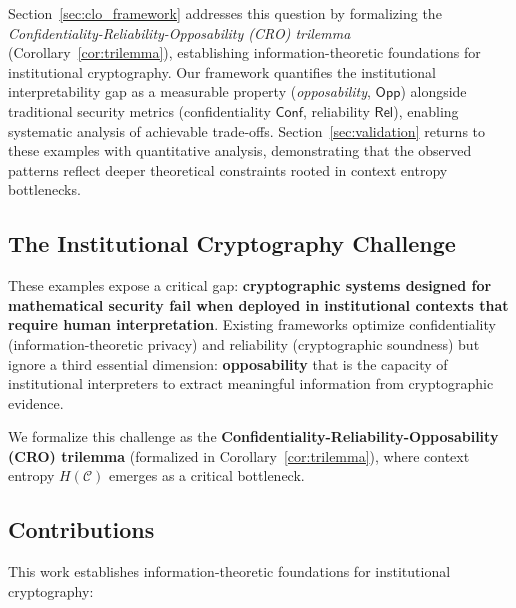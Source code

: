 \documentclass{ieeeaccess}
\begin{document}
Section~\ref{sec:clo_framework} addresses this question by formalizing the \emph{Confidentiality-Reliability-Opposability (CRO) trilemma} (Corollary~\ref{cor:trilemma}), establishing information-theoretic foundations for institutional cryptography. Our framework quantifies the institutional interpretability gap as a measurable property (\emph{opposability}, $\mathsf{Opp}$) alongside traditional security metrics (confidentiality $\mathsf{Conf}$, reliability $\mathsf{Rel}$), enabling systematic analysis of achievable trade-offs. Section~\ref{sec:validation} returns to these examples with quantitative analysis, demonstrating that the observed patterns reflect deeper theoretical constraints rooted in context entropy bottlenecks.


\subsection{The Institutional Cryptography Challenge}

These examples expose a critical gap: \textbf{cryptographic systems designed for mathematical security fail when deployed in institutional contexts that require human interpretation}. Existing frameworks optimize confidentiality (information-theoretic privacy) and reliability (cryptographic soundness) but ignore a third essential dimension: \textbf{opposability} that is the capacity of institutional interpreters to extract meaningful information from cryptographic evidence.

We formalize this challenge as the \textbf{Confidentiality-Reliability-Opposability (CRO) trilemma} (formalized in Corollary~\ref{cor:trilemma}), where context entropy $H(\mathcal{C})$ emerges as a critical bottleneck.

\subsection{Contributions}\label{subsec:Contributions}

This work establishes information-theoretic foundations for institutional cryptography:
\end{document}
